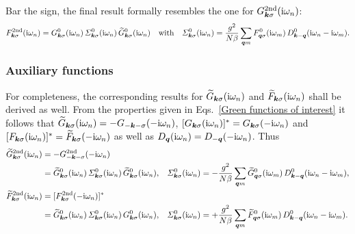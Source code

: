 %
Bar the sign, the final result formally resembles the one for $G
\sp{\text{2nd}}_{\boldsymbol k \sigma}(\mathrm i \omega_n)$:
%
\begin{equation*}
    F \sp{\text{2nd}}_{\boldsymbol k \sigma}(\mathrm i \omega_n)
    = G^0_{\boldsymbol k \sigma}(\mathrm i \omega_n) \,
    \varSigma^0_{\boldsymbol k \sigma}(\mathrm i \omega_n) \,
    \widetilde G^0_{\boldsymbol k \sigma}(\mathrm i \omega_n)
    \quad \text{with} \quad
    \varSigma^0_{\boldsymbol k \sigma}(\mathrm i \omega_n)
    = \frac {g^2}{N \beta} \sum_{\boldsymbol q m}
    F^0_{\boldsymbol q \sigma}(\mathrm i \omega_m) \,
    D^0_{\boldsymbol k - \boldsymbol q}(\mathrm i \omega_n - \mathrm i \omega_m).
\end{equation*}

\subsubsection{Auxiliary  functions}

For completeness, the corresponding results for $\widetilde G_{\boldsymbol k \sigma}(\mathrm i
\omega_n)$ and $\widetilde F_{\boldsymbol k \sigma}(\mathrm i \omega_n)$ shall be derived as
well. From the properties given in Eqs.~\ref{Green functions of interest} it
follows that $\widetilde G_{\boldsymbol k \sigma}(\mathrm i \omega_n) = -G_{-\boldsymbol k
-\sigma}(-\mathrm i \omega_n)$, $[G_{\boldsymbol k \sigma}(\mathrm i \omega_n)]^* = G_{\boldsymbol k
\sigma}(-\mathrm i \omega_n)$ and $[F_{\boldsymbol k \sigma}(\mathrm i \omega_n)]^* = \widetilde
F_{\boldsymbol k \sigma}(-\mathrm i \omega_n)$ as well as $D_{\boldsymbol q}(\mathrm i \omega_n) = D_{-\boldsymbol
q}(-\mathrm i \omega_n)$. Thus
%
\begin{align*}
    \widetilde G \sp{\text{2nd}}_{\boldsymbol k \sigma}(\mathrm i \omega_n)
    &= -G \sp{\text{2nd}}_{-\boldsymbol k -\sigma}(-\mathrm i \omega_n) &&
    \\
    &= \widetilde G^0_{\boldsymbol k \sigma}(\mathrm i \omega_n) \,
    \varSigma^0_{\boldsymbol k \sigma}(\mathrm i \omega_n) \,
    \widetilde G^0_{\boldsymbol k \sigma}(\mathrm i \omega_n),
    &
    \varSigma^0_{\boldsymbol k \sigma}(\mathrm i \omega_n)
    &= -\frac {g^2}{N \beta} \sum_{\boldsymbol q m}
    \widetilde G^0_{\boldsymbol q \sigma}(\mathrm i \omega_m) \,
    D^0_{\boldsymbol k - \boldsymbol q}(\mathrm i \omega_n - \mathrm i \omega_m),
    \\
    \widetilde F \sp{\text{2nd}}_{\boldsymbol k \sigma}(\mathrm i \omega_n)
    &= [F \sp{\text{2nd}}_{\boldsymbol k \sigma}(-\mathrm i \omega_n)]^* &&
    \\
    &= \widetilde G^0_{\boldsymbol k \sigma}(\mathrm i \omega_n) \,
    \varSigma^0_{\boldsymbol k \sigma}(\mathrm i \omega_n) \,
    G^0_{\boldsymbol k \sigma}(\mathrm i \omega_n),
    &
    \varSigma^0_{\boldsymbol k \sigma}(\mathrm i \omega_n)
    &= +\frac {g^2}{N \beta} \sum_{\boldsymbol q m}
    \widetilde F^0_{\boldsymbol q \sigma}(\mathrm i \omega_m) \,
    D^0_{\boldsymbol k - \boldsymbol q}(\mathrm i \omega_n - \mathrm i \omega_m).
\end{align*}

